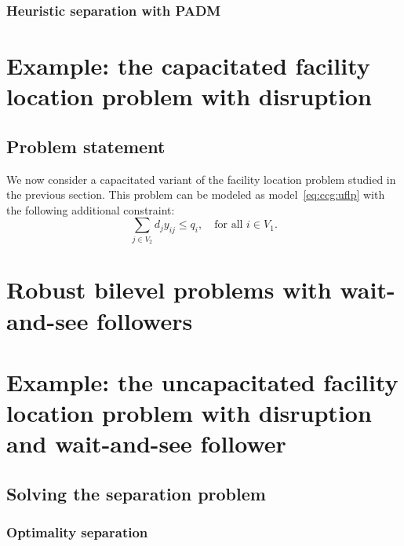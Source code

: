 
\subsubsection*{Heuristic separation with PADM}


\section[Example: the CFLP with disruption]{Example: the capacitated facility location problem with disruption}

\subsection{Problem statement}

We now consider a capacitated variant of the facility location problem studied
in the previous section. This problem can be modeled as
model~\eqref{eq:ccg:uflp} with the following additional constraint:
\begin{equation*}
    \sum_{j\in V_2} d_jy_{ij} \le q_i, \quad \text{for all } i\in V_1.
\end{equation*}

\section{Robust bilevel problems with wait-and-see followers}

\section[Example: the bilevel UFLP with disruption]{Example: the uncapacitated facility location problem with disruption and wait-and-see follower}

\subsection{Solving the separation problem}

\subsubsection{Optimality separation}
